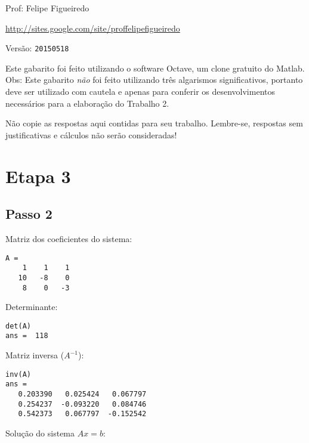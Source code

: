 \documentclass[a4paper]{article}
\begin{document}
\parbox[c]{.825\textwidth}{\raggedright%
{Prof: Felipe Figueiredo\par}
{\url{http://sites.google.com/site/proffelipefigueiredo}\par}
}

Versão: \verb|20150518|


Este gabarito foi feito utilizando o software Octave, um clone
gratuito do Matlab.  Obs: Este gabarito \emph{não} foi feito
utilizando três algarismos significativos, portanto deve ser utilizado
com cautela e apenas para conferir os desenvolvimentos necessários
para a elaboração do Trabalho 2.

Não copie as respostas aqui contidas para seu trabalho. Lembre-se,
respostas sem justificativas e cálculos não serão consideradas!

\section*{Etapa 3}

\subsection*{Passo 2}

Matriz dos coeficientes do sistema:

\begin{verbatim}
A =
    1    1    1
   10   -8    0
    8    0   -3
\end{verbatim}

Determinante:

\begin{verbatim}
det(A)
ans =  118
\end{verbatim}

Matriz inversa ($A^{-1}$):

\begin{verbatim}
inv(A)
ans =
   0.203390   0.025424   0.067797
   0.254237  -0.093220   0.084746
   0.542373   0.067797  -0.152542
\end{verbatim}

Solução do sistema $Ax=b$:
\end{document}
